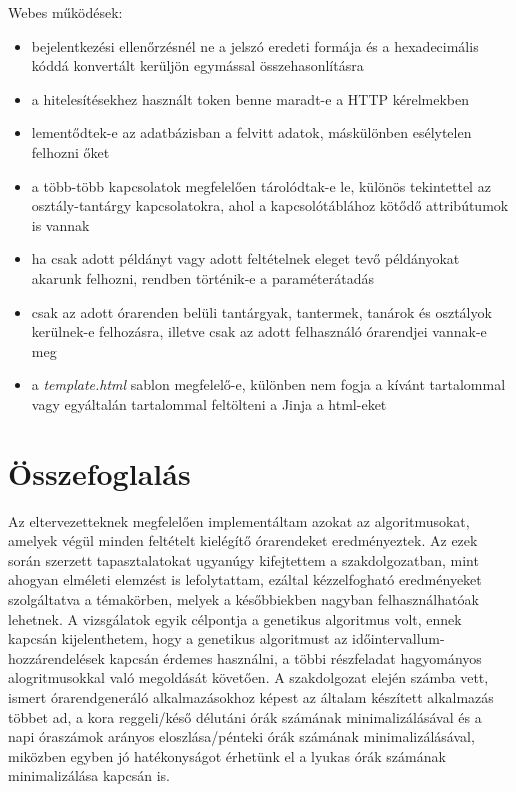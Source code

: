 \documentclass[12pt,a4paper]{report}
\begin{document}
Webes működések:
\begin{itemize}
\item bejelentkezési ellenőrzésnél ne a jelszó eredeti formája és a hexadecimális kóddá konvertált kerüljön egymással összehasonlításra
\item a hitelesítésekhez használt token benne maradt-e a HTTP kérelmekben
\item lementődtek-e az adatbázisban a felvitt adatok, máskülönben esélytelen felhozni őket
\item a több-több kapcsolatok megfelelően tárolódtak-e le, különös tekintettel az osztály-tantárgy kapcsolatokra, ahol a kapcsolótáblához kötődő attribútumok is vannak
\item ha csak adott példányt vagy adott feltételnek eleget tevő példányokat akarunk felhozni,  rendben történik-e a paraméterátadás
\item csak az adott órarenden belüli tantárgyak, tantermek, tanárok és osztályok kerülnek-e felhozásra, illetve csak az adott felhasználó órarendjei vannak-e meg
\item a \textit{template.html} sablon megfelelő-e, különben nem fogja a kívánt tartalommal vagy egyáltalán tartalommal feltölteni a Jinja a html-eket
\end{itemize}

\newpage

\chapter{Összefoglalás}

Az eltervezetteknek megfelelően implementáltam azokat az algoritmusokat, amelyek végül minden feltételt kielégítő órarendeket eredményeztek. Az ezek során szerzett tapasztalatokat ugyanúgy kifejtettem a szakdolgozatban, mint ahogyan elméleti elemzést is lefolytattam, ezáltal kézzelfogható eredményeket szolgáltatva a témakörben, melyek a későbbiekben nagyban felhasználhatóak lehetnek. A vizsgálatok egyik célpontja a genetikus algoritmus volt, ennek kapcsán kijelenthetem, hogy a genetikus algoritmust az időintervallum-hozzárendelések kapcsán érdemes használni, a többi részfeladat hagyományos alogritmusokkal való megoldását követően. A szakdolgozat elején számba vett, ismert órarendgeneráló alkalmazásokhoz képest az általam készített alkalmazás többet ad, a kora reggeli/késő délutáni órák számának minimalizálásával és a napi óraszámok arányos eloszlása/pénteki órák számának minimalizálásával, miközben egyben jó hatékonyságot érhetünk el a lyukas órák számának minimalizálása kapcsán is.
\end{document}
